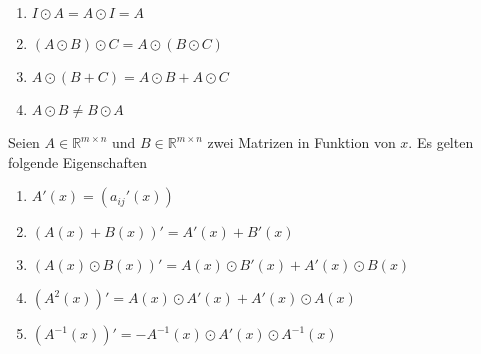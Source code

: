 \begin{enumerate}[$(i)$]
\item $I\odot A=A\odot I=A$
\item $\left(A\odot B\right)\odot C=A\odot\left(B\odot C\right)$
\item $A\odot\left(B+C\right)=A\odot B+A\odot C$
\item $A\odot B\neq B\odot A$
\end{enumerate}
Seien $A\in\mathbb{R}^{m\times n}$ und $B\in\mathbb{R}^{m\times n}$ zwei Matrizen in Funktion von $x$. Es gelten folgende Eigenschaften
\begin{enumerate}[$(i)$]
\item $A'\left(x\right)=\left(a_{ij}'\left(x\right)\right)$
\item $\left(A\left(x\right)+B\left(x\right)\right)'=A'\left(x\right)+B'\left(x\right)$
\item $\left(A\left(x\right)\odot B\left(x\right)\right)'=A\left(x\right)\odot B'\left(x\right)+A'\left(x\right)\odot B\left(x\right)$
\item $\left(A^2\left(x\right)\right)'=A\left(x\right)\odot A'\left(x\right)+A'\left(x\right)\odot A\left(x\right)$
\item $\left(A^{-1}\left(x\right)\right)'=-A^{-1}\left(x\right)\odot A'\left(x\right)\odot A^{-1}\left(x\right)$
\end{enumerate}
